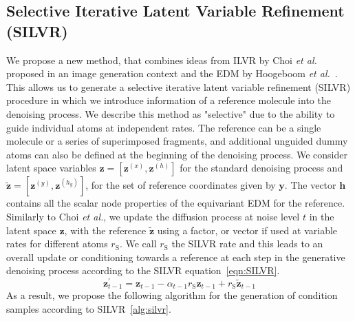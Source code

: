 \documentclass[journal=jacsat,manuscript=article]{achemso}
\begin{document}
\subsection{Selective Iterative Latent Variable Refinement (SILVR)}
\label{sec:silvr}
We propose a new method, that combines ideas from ILVR by Choi \textit{et al.}~\cite{choi2021ilvr} proposed in an image generation context and the EDM by Hoogeboom \textit{et al.}~\cite{hoogeboom2022equivariant}. This allows us to generate a selective iterative latent variable refinement (SILVR) procedure in which we introduce information of a reference molecule into the denoising process. We describe this method as "selective" due to the ability to guide individual atoms at independent rates. The reference can be a single molecule or a series of superimposed fragments, and additional unguided dummy atoms can also be defined at the beginning of the denoising process. We consider latent space variables $\mathbf{z}=[\mathbf{z}^{(x)},\mathbf{z}^{(h)}]$ for the standard denoising process and  $\mathbf{\tilde{z}} = [\mathbf{z}^{(y)},\mathbf{z}^{(h_y)}]$, for the set of reference coordinates given by $\mathbf{y}$. The vector $\mathbf{h}$ contains all the scalar node properties of the equivariant EDM for the reference. 
Similarly to Choi \textit{et al.}, we update the diffusion process at noise level $t$ in the latent space $\mathbf{z}$, with the reference $\mathbf{\tilde{z}}$ using a factor, or vector if used at variable rates for different atoms $r_{\mathrm{S}}$. We call $r_{\mathrm{S}}$ the SILVR rate and this leads to an overall update or conditioning towards a reference at each step in the generative denoising process according to the SILVR equation~\ref{eqn:SILVR}.
\begin{equation}
\mathbf{z}_{t-1}^{\prime} = \mathbf{z}_{t-1}-\alpha_{t-1}r_{\mathrm{S}}\mathbf{z}_{t-1}+r_{\mathrm{S}}\mathbf{\tilde{z}}_{t-1}
    \label{eqn:SILVR}
\end{equation}
As a result, we propose the following algorithm for the generation of condition samples according to SILVR~\ref{alg:silvr}.
\end{document}
